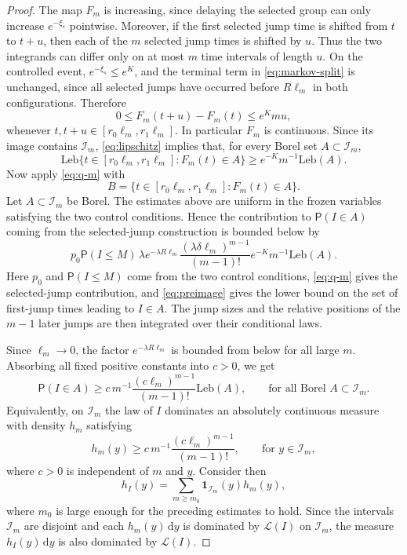 \documentclass[10pt,a4paper]{amsart}
\newcommand{\Prob}{\mathsf P}
\newcommand{\1}{\mathbf 1}
\newcommand{\law}{\mathcal L}
\newcommand{\dd}{\mathrm d}
\begin{document}
\begin{proof}
The map $F_m$ is increasing, since delaying the selected group can only increase $e^{-\xi_s}$ pointwise. Moreover, if the first selected jump time is shifted from $t$ to $t+u$, then each of the $m$ selected jump times is shifted by $u$. Thus the two integrands can differ only on at most $m$ time intervals of length $u$. On the controlled event, $e^{-\xi_s}\leq e^K$, and the terminal term in \eqref{eq:markov-split} is unchanged, since all selected jumps have occurred before $R\ell_m$ in both configurations. Therefore
\begin{equation}\label{eq:lipschitz}
 0\leq F_m(t+u)-F_m(t)\leq e^Kmu,
\end{equation}
whenever $t,t+u\in[r_0\ell_m,r_1\ell_m]$.
In particular $F_m$ is continuous. Since its image contains $\mathcal I_m$, \eqref{eq:lipschitz} implies that, for every Borel set $A\subset\mathcal I_m$,
\begin{equation}\label{eq:preimage}
 \mathrm{Leb}\{t\in[r_0\ell_m,r_1\ell_m]:F_m(t)\in A\}
 \geq
 e^{-K}m^{-1}\mathrm{Leb}(A).
\end{equation}
Now apply \eqref{eq:q-m} with
\[
 B=\{t\in[r_0\ell_m,r_1\ell_m]:F_m(t)\in A\}.
\]
Let $A\subset \mathcal I_m$ be Borel. The estimates above are uniform in the frozen variables satisfying the two control conditions. Hence the contribution to $\Prob(I\in A)$ coming from the selected-jump construction is bounded below by
\[
 p_0\Prob(I\leq M)\,
 \lambda e^{-\lambda R\ell_m}
 \frac{(\lambda\delta\ell_m)^{m-1}}{(m-1)!}
 e^{-K}m^{-1}\mathrm{Leb}(A).
\]
Here $p_0$ and $\Prob(I\leq M)$ come from the two control conditions, \eqref{eq:q-m} gives the selected-jump contribution, and \eqref{eq:preimage} gives the lower bound on the set of first-jump times leading to $I\in A$. The jump sizes and the relative positions of the $m-1$ later jumps are then integrated over their conditional laws.

Since $\ell_m\to0$, the factor $e^{-\lambda R\ell_m}$ is bounded from below for all large $m$. Absorbing all fixed positive constants into $c>0$, we get
\[
 \Prob(I\in A)
 \geq
 c\,m^{-1}\frac{(c\ell_m)^{m-1}}{(m-1)!}\mathrm{Leb}(A),
 \qquad
 \text{for all Borel }A\subset\mathcal I_m.
\]
Equivalently, on $\mathcal I_m$ the law of $I$ dominates an absolutely continuous measure with density $h_m$ satisfying
\begin{equation}\label{eq:hm-lower}
 h_m(y)\geq c\,m^{-1}\frac{(c\ell_m)^{m-1}}{(m-1)!},
 \qquad
 \text{for }y\in\mathcal I_m,
\end{equation}
where $c>0$ is independent of $m$ and $y$.
Consider then
\[
 h_I(y)=\sum_{m\geq m_0}\1_{\mathcal I_m}(y)h_m(y),
\]
where $m_0$ is large enough for the preceding estimates to hold. Since the intervals $\mathcal I_m$ are disjoint and each $h_m(y)\,\dd y$ is dominated by $\law(I)$ on $\mathcal I_m$, the measure $h_I(y)\,\dd y$ is also dominated by $\law(I)$.


\end{proof}
\end{document}
